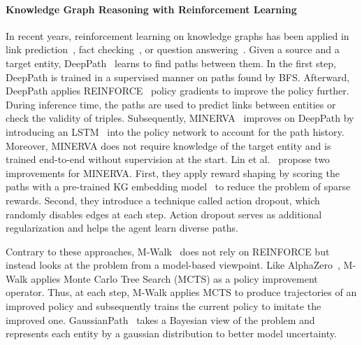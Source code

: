\paragraph{Knowledge Graph Reasoning with Reinforcement Learning}

In recent years, reinforcement learning on knowledge graphs has been applied in link prediction~\cite{Das2018Minerva}, fact checking~\cite{Xiong2017DeePpath}, or question answering~\cite{Qiu2020Stepwise}. Given a source and a target entity, DeepPath~\cite{Xiong2017DeePpath} learns to find paths between them. In the first step, DeepPath is trained in a supervised manner on paths found by BFS. Afterward, DeepPath applies REINFORCE~\cite{Williams1992REINFORCE} policy gradients to improve the policy further.
During inference time, the paths are used to predict links between entities or check the validity of triples. Subsequently, MINERVA~\cite{Das2018Minerva} improves on DeepPath by introducing an LSTM~\cite{Hochreiter1997LSTM} into the policy network to account for the path history. Moreover, MINERVA does not require knowledge of the target entity and is trained end-to-end without supervision at the start. Lin et al.~\cite{Lin2020RewardShaping} propose two improvements for MINERVA. First, they apply reward shaping by scoring the paths with a pre-trained KG embedding model~\cite{Dettmers2018ConvE} to reduce the problem of sparse rewards. Second, they introduce a technique called action dropout, which randomly disables edges at each step. Action dropout serves as additional regularization and helps the agent learn diverse paths.


Contrary to these approaches, M-Walk~\cite{Shen2018MWalk} does not rely on REINFORCE but instead looks at the problem from a model-based viewpoint. 
Like AlphaZero~\cite{Silver2018AlphaZero}, M-Walk applies Monte Carlo Tree Search (MCTS) as a policy improvement operator. Thus, at each step, M-Walk applies MCTS to produce trajectories of an improved policy and subsequently trains the current policy to imitate the improved one. GaussianPath~\cite{Wan2021GaussianPath} takes a Bayesian view of the problem and represents each entity by a gaussian distribution to better model uncertainty.

